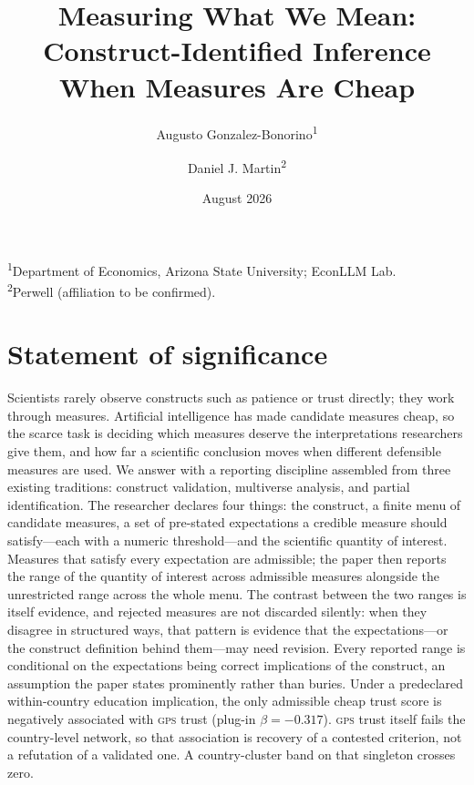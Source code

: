 \documentclass[10pt,letterpaper]{article}
\newcommand{\GPS}{\textsc{gps}}
\begin{document}
\title{Measuring What We Mean:\\[2pt] Construct-Identified Inference When Measures Are Cheap}
\author{%
  Augusto Gonzalez-Bonorino\textsuperscript{1}\and
  Daniel J. Martin\textsuperscript{2}}
\date{August 2026}
\maketitle
\begin{center}\small
\textsuperscript{1}Department of Economics, Arizona State University; EconLLM Lab.\\
\textsuperscript{2}Perwell (affiliation to be confirmed).
\end{center}

\section*{Statement of significance}
Scientists rarely observe constructs such as patience or trust directly; they work through measures.
Artificial intelligence has made candidate measures cheap, so the scarce task is deciding which measures deserve the interpretations researchers give them, and how far a scientific conclusion moves when different defensible measures are used.
We answer with a reporting discipline assembled from three existing traditions: construct validation, multiverse analysis, and partial identification.
The researcher declares four things: the construct, a finite menu of candidate measures, a set of pre-stated expectations a credible measure should satisfy---each with a numeric threshold---and the scientific quantity of interest.
Measures that satisfy every expectation are admissible; the paper then reports the range of the quantity of interest across admissible measures alongside the unrestricted range across the whole menu.
The contrast between the two ranges is itself evidence, and rejected measures are not discarded silently: when they disagree in structured ways, that pattern is evidence that the expectations---or the construct definition behind them---may need revision.
Every reported range is conditional on the expectations being correct implications of the construct, an assumption the paper states prominently rather than buries.
Under a predeclared within-country education implication, the only admissible cheap trust score is negatively associated with \GPS{} trust (plug-in $\beta=-0.317$).
\GPS{} trust itself fails the country-level network, so that association is recovery of a contested criterion, not a refutation of a validated one.
A country-cluster band on that singleton crosses zero.
\end{document}
